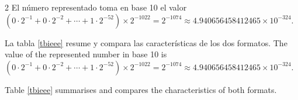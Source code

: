 \begin{center}
\end{center}
\begin{paracol}{2}
El número representado toma en base 10 el valor $(0\cdot2^{-1}+0\cdot2^{-2}+\cdots+1\cdot2^{-52})\times2^{-1022}=2^{-1074}\approx  4.940656458412465\times10^{-324}$.

La tabla \ref{tbieee} resume y compara las características de los dos formatos.
\switchcolumn
The value of the represented number in base 10 is $(0\cdot2^{-1}+0\cdot2^{-2}+\cdots+1\cdot2^{-52})\times2^{-1022}=2^{-1074}\approx  4.940656458412465\times10^{-324}$.

Table \ref{tbieee} summarises and compares the characteristics of both formats.
\end{paracol}
